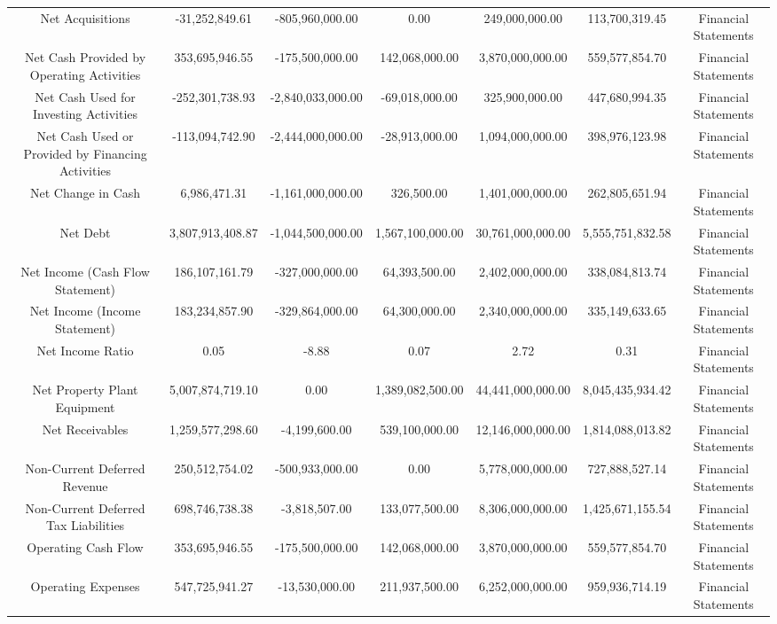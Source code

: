 \begin{longtable}{ccccccc}
Net Acquisitions & -31,252,849.61 & -805,960,000.00 & 0.00 & 249,000,000.00 & 113,700,319.45 & Financial Statements \\
Net Cash Provided by Operating Activities & 353,695,946.55 & -175,500,000.00 & 142,068,000.00 & 3,870,000,000.00 & 559,577,854.70 & Financial Statements \\
Net Cash Used for Investing Activities & -252,301,738.93 & -2,840,033,000.00 & -69,018,000.00 & 325,900,000.00 & 447,680,994.35 & Financial Statements \\
Net Cash Used or Provided by Financing Activities & -113,094,742.90 & -2,444,000,000.00 & -28,913,000.00 & 1,094,000,000.00 & 398,976,123.98 & Financial Statements \\
Net Change in Cash & 6,986,471.31 & -1,161,000,000.00 & 326,500.00 & 1,401,000,000.00 & 262,805,651.94 & Financial Statements \\
Net Debt & 3,807,913,408.87 & -1,044,500,000.00 & 1,567,100,000.00 & 30,761,000,000.00 & 5,555,751,832.58 & Financial Statements \\
Net Income (Cash Flow Statement) & 186,107,161.79 & -327,000,000.00 & 64,393,500.00 & 2,402,000,000.00 & 338,084,813.74 & Financial Statements \\
Net Income (Income Statement) & 183,234,857.90 & -329,864,000.00 & 64,300,000.00 & 2,340,000,000.00 & 335,149,633.65 & Financial Statements \\
Net Income Ratio & 0.05 & -8.88 & 0.07 & 2.72 & 0.31 & Financial Statements \\
Net Property Plant Equipment & 5,007,874,719.10 & 0.00 & 1,389,082,500.00 & 44,441,000,000.00 & 8,045,435,934.42 & Financial Statements \\
Net Receivables & 1,259,577,298.60 & -4,199,600.00 & 539,100,000.00 & 12,146,000,000.00 & 1,814,088,013.82 & Financial Statements \\
Non-Current Deferred Revenue & 250,512,754.02 & -500,933,000.00 & 0.00 & 5,778,000,000.00 & 727,888,527.14 & Financial Statements \\
Non-Current Deferred Tax Liabilities & 698,746,738.38 & -3,818,507.00 & 133,077,500.00 & 8,306,000,000.00 & 1,425,671,155.54 & Financial Statements \\
Operating Cash Flow & 353,695,946.55 & -175,500,000.00 & 142,068,000.00 & 3,870,000,000.00 & 559,577,854.70 & Financial Statements \\
Operating Expenses & 547,725,941.27 & -13,530,000.00 & 211,937,500.00 & 6,252,000,000.00 & 959,936,714.19 & Financial Statements \\

\end{longtable}
